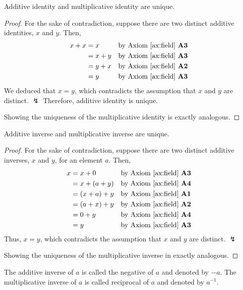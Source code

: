 \documentclass[../main.tex]{subfiles}
\begin{document}
\begin{thm}
    Additive identity and multiplicative identity are unique.
\end{thm}
\begin{proof}
    For the sake of contradiction, suppose there are two distinct additive identities, $x$ and $y$.
    Then,
    \begin{align*}
        x + x &= x &\text{by Axiom~\ref{ax:field} \textbf{A3}}\\
              &= x + y &\text{by Axiom~\ref{ax:field} \textbf{A3}}\\
              &= y + x &\text{by Axiom~\ref{ax:field} \textbf{A2}}\\
              &= y &\text{by Axiom~\ref{ax:field} \textbf{A3}}
    \end{align*}
    We deduced that $x = y$, which contradicts the assumption that $x$ and $y$ are distinct. $\lightning$
    Therefore, additive identity is unique.

    Showing the uniqueness of the multiplicative identity is exactly analogous.
\end{proof}

\begin{thm}
    Additive inverse and multiplicative inverse are unique.
\end{thm}
\begin{proof}
    For the sake of contradiction, suppose there are two distinct additive inverses, $x$ and $y$, for an element $a$.
    Then,
    \begin{align*}
        x &= x + 0 &\text{by Axiom~\ref{ax:field} \textbf{A3}}\\
          &= x + (a + y) &\text{by Axiom~\ref{ax:field} \textbf{A4}}\\
          &= (x + a) + y &\text{by Axiom~\ref{ax:field} \textbf{A1}}\\
          &= (a + x) + y &\text{by Axiom~\ref{ax:field} \textbf{A2}}\\
          &= 0 + y &\text{by Axiom~\ref{ax:field} \textbf{A4}}\\
          &= y &\text{by Axiom~\ref{ax:field} \textbf{A3}}
    \end{align*}
    Thus, $x = y$, which contradicts the assumption that $x$ and $y$ are distinct. $\lightning$

    Showing the uniqueness of the multiplicative inverse in exactly analogous.
\end{proof}

The additive inverse of $a$ is called the \textsf{negative} of $a$ and denoted by $-a$.
The multiplicative inverse of $a$ is called \textsf{reciprocal} of $a$ and denoted by $a^{-1}$.
\end{document}
